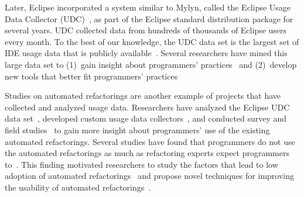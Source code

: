 %
Later, Eclipse incorporated a system similar to Mylyn, called the Eclipse Usage
Data Collector (UDC)~\cite{WebPageUDC}, as part of the Eclipse standard
distribution package for several years. UDC collected data from hundreds of
thousands of Eclipse users every month. To the best of our knowledge, the UDC
data set is the largest set of IDE usage data that is publicly
available~\cite{WebPageUDCArchive}. Several researchers have mined this large
data set to
%
(1)~gain insight about programmers'
practices~\cite{VakilianJohnson2014Alternate, VakilianETAL2013Compositional,
V:MurphyHill2012How} and
%
(2)~develop new tools that better fit programmers'
practices~\cite{MurphyHill2012Improving, VakilianETAL2013Compositional}%


Studies on automated refactorings are another example of projects that have
collected and analyzed usage data. Researchers have analyzed the Eclipse UDC
data set~\cite{V:MurphyHill2012How, VakilianETAL2013Compositional}, developed
custom usage data collectors~\cite{VakilianETAL2012UseDisuseMisuse}, and
conducted survey and field studies~\cite{V:MurphyHill2012How,
VakilianJohnson2014Alternate, NegaraETAL2013ManualRefactorings} to gain more
insight about programmers' use of the existing automated refactorings. Several
studies have found that programmers do not use the automated refactorings as
much as refactoring experts expect programmers to~\cite{V:MurphyHill2012How,
NegaraETAL2013ManualRefactorings}. This finding motivated researchers to study
the factors that lead to low adoption of automated
refactorings~\cite{VakilianETAL2012UseDisuseMisuse, V:MurphyHill2012How} and
propose novel techniques for improving the usability of automated
refactorings~\cite{V:MurphyHill2012How, MurphyHill2012Improving,
MurphyHill2008ExtractMethod, LeeETAL2013DragDrop, MurphyHillETAL2011Gestures,
GeETAL2012BeneFactor, FosterETAL2012WitchDoctor}.
%
%

